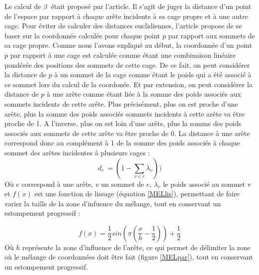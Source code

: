 Le calcul de $\beta~$ était proposé par l'article. Il s'agit de juger
la distance d'un point de l'espace par rapport à chaque arête
incidente à sa cage propre et à une autre cage. Pour éviter de
calculer des distances euclidiennes, l'article propose de se baser sur
la coordonnée calculée pour chaque point $p$ par rapport aux sommets
de sa cage propre. Comme nous l'avons expliqué au début, la coordonnée
d'un point $p$ par rapport à une cage est calculée comme étant une
combinaison linéaire pondérée des positions des sommets de cette
cage. De ce fait, on peut considérer la distance de $p$ à un sommet de
la cage comme étant le poids qui a été associé à ce sommet lors du
calcul de la coordonée. Et par extension, on peut considérer la
distance de $p$ à une arête comme étant liée à la somme des poids
associés aux sommets incidents de cette arête. Plus précisément, plus
on est proche d'une arête, plus la somme des poids associés sommets
incidents à cette arête va être proche de 1. A l'inverse, plus on est
loin d'une arête, plus la somme des poids associés aux sommets de
cette arête va être proche de 0. La distance à une arête correspond
donc au complément à 1 de la somme des poids associés à chaque sommet
des arêtes incidentes à plusieurs cages :
\begin{equation}
  d_e~ = (1 - \sum_{v \in e} \lambda_v))
\end{equation}
Où $e$ correspond à une arête, $v$ un sommet de $e$, $\lambda_v$ le
poids associé au sommet v et $f(x)$ est une fonction de lissage
(équation \ref{MELlis}), permettant de faire varier la taille de la
zone d'infuence du mélange, tout en conservant un estompement
progressif :

\begin{equation}
  f(x) = \frac{1}{2} sin(\pi(\frac{x}{h}-\frac{1}{2})) + \frac{1}{2}
  \label{MELlis}
\end{equation}
Où $h$ représente la zone d'influence de l'arête, ce qui permet de
délimiter la zone où le mélange de coordonnées doit être fait (figure
\ref{MELpar}), tout en conservant un estompement progressif.

